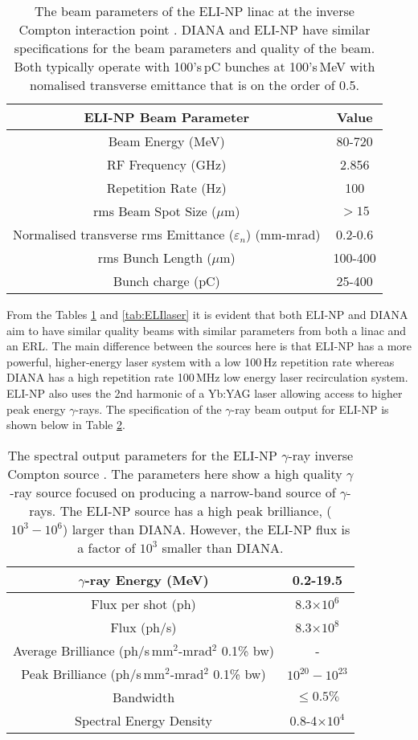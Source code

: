 \documentclass[11pt]{article}
\begin{document}
\begin{table}[H]
\centering
\begin{tabular}{|c||c|}
\hline
\textbf{ELI-NP Beam Parameter} & \textbf{Value} \\
\hline
Beam Energy (MeV) & 80-720 \\
\hline
RF Frequency (GHz) & 2.856 \\
\hline
Repetition Rate (Hz) & 100 \\
\hline
rms Beam Spot Size ($\mu$m) & $ > 15$ \\
\hline
Normalised transverse rms Emittance ($\varepsilon_{n}$) (mm-mrad) & 0.2-0.6 \\
\hline
rms Bunch Length ($\mu$m) & 100-400 \\
\hline
Bunch charge (pC) & 25-400 \\
\hline
\end{tabular} 
\caption{\label{tab:ELIbeam} The beam parameters of the ELI-NP linac at the inverse Compton interaction point \cite{EurogammaS}. DIANA and ELI-NP have similar specifications for the beam parameters and quality of the beam. Both typically operate with 100's\,pC bunches at 100's\,MeV with nomalised transverse emittance that is on the order of 0.5.}
\end{table}

From the Tables \ref{tab:ELIbeam} and \ref{tab:ELIlaser} it is evident that both ELI-NP and DIANA aim to have similar quality beams with similar parameters from both a linac and an ERL. The main difference between the sources here is that ELI-NP has a more powerful, higher-energy laser system with a low 100\,Hz repetition rate whereas DIANA has a high repetition rate 100\,MHz low energy laser recirculation system. ELI-NP also uses the 2nd harmonic of a Yb:YAG laser allowing access to higher peak energy $\gamma$-rays. The specification of the $\gamma$-ray beam output for ELI-NP is shown below in Table \ref{tab:ELIout}.

\begin{table}[H]
\centering
\begin{tabular}{|c||c|}
\hline
$\gamma$-ray Energy (MeV) & 0.2-19.5 \\
\hline
Flux per shot (ph) & 8.3$\times 10^{6}$ \\
\hline
Flux (ph/s) & 8.3$\times 10^{8}$ \\
\hline
Average Brilliance (ph/s\,mm$^{2}$-mrad$^{2}$ 0.1\% bw) & - \\
\hline
Peak Brilliance (ph/s\,mm$^{2}$-mrad$^{2}$ 0.1\% bw) & $10^{20}-10^{23}$ \\
\hline
Bandwidth & $\leq 0.5\%$ \\
\hline
Spectral Energy Density & 0.8-4$\times 10^{4}$ \\
\hline
\end{tabular}
\caption{\label{tab:ELIout} The spectral output parameters for the ELI-NP $\gamma$-ray inverse Compton source \cite{EurogammaS}. The parameters here show a high quality $\gamma$-ray source focused on producing a narrow-band source of $\gamma$-rays. The ELI-NP source has a high peak brilliance, ($10^{3} - 10^{6}$) larger than DIANA. However, the ELI-NP flux is a factor of $10^{3}$ smaller than DIANA.}
\end{table}
\end{document}
